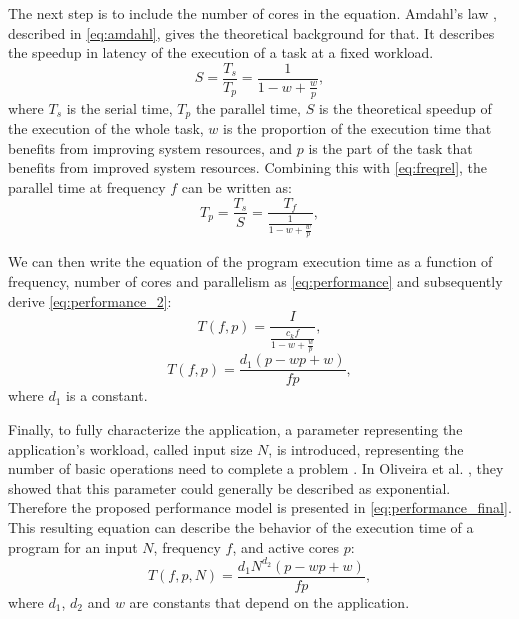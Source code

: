 \documentclass{ieeeaccess}
\begin{document}
The next step is to include the number of cores in the equation. Amdahl's law \cite{Amdahl1967ValidityCapabilities}, described in \cref{eq:amdahl}, gives the theoretical background for that. It describes the speedup in latency of the execution of a task at a fixed workload.
\begin{equation}
S=\frac{T_s}{T_p}=\frac{1}{1-w+\frac{w}{p}},
\label{eq:amdahl}
\end{equation}
where $T_s$ is the serial time, $T_p$ the parallel time, $S$ is the theoretical speedup of the execution of the whole task, $w$ is the proportion of the execution time that benefits from improving system resources, and $p$ is the part of the task that benefits from improved system resources. Combining this with \cref{eq:freqrel}, the parallel time at frequency $f$ can be written as:
\begin{equation}
T_p=\frac{T_s}{S}=\frac{T_f}{\frac{1}{1-w+\frac{w}{p}}},
\label{eq:parallel_time}
\end{equation}

We can then write the equation of the program execution time as a function of frequency, number of cores and parallelism  as \cref{eq:performance} and subsequently derive \cref{eq:performance_2}:
\begin{equation}
T(f,p)=\frac{I}{ \frac{c_kf}{1-w+\frac{w}{p}} },
\label{eq:performance}
\end{equation}
\begin{equation}
T(f,p)=\frac{d_1(p-wp+w)}{fp},
\label{eq:performance_2}
\end{equation}
where $d_1$ is a constant.

Finally, to fully characterize the application, a parameter representing the application's workload, called input size $N$, is introduced, representing the number of basic operations need to complete a problem \cite{Kumar1994AnalyzingArchitectures}. In Oliveira et al. \cite{Oliveira2018ApplicationCores}, they showed that this parameter could generally be described as exponential. Therefore the proposed performance model is presented in \cref{eq:performance_final}. This resulting equation can describe the behavior of the execution time of a program for an input $N$, frequency $f$, and active cores $p$:
\begin{equation}
T(f,p,N)=\frac{d_1N^{d_2}(p-wp+w)}{fp},
\label{eq:performance_final}
\end{equation}
where $d_1$, $d_2$ and $w$ are constants that depend on the application. 
\end{document}
